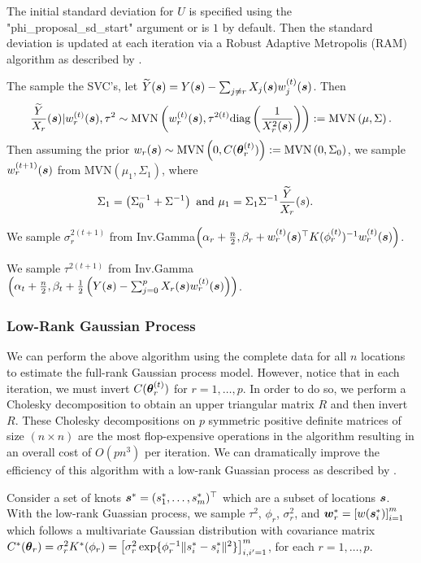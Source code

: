 The initial standard deviation for $U$ is specified using the "phi\_proposal\_sd\_start" argument or is $1$ by default. Then the standard deviation is updated at each iteration via a Robust Adaptive Metropolis (RAM) algorithm as described by \cite{vihola}.

The sample the SVC's, let $\widetilde{Y}(\boldsymbol{s}) = Y(\boldsymbol{s}) - \sum_{j\neq r} X_j(\boldsymbol{s})w_j^{(t)}(\boldsymbol{s})$. Then
\begin{align*}
    \frac{\widetilde{Y}}{X_r}(\boldsymbol{s}) | w_r^{(t)}(\boldsymbol{s}), \tau^2 \sim \text{MVN} \left(w_r^{(t)}(\boldsymbol{s}), \tau^{2(t)} \text{diag}\left( \frac{1}{X_r^2(\boldsymbol{s})} \right)\right) := \text{MVN} \left(\mu, \Sigma\right).
\end{align*}
Then assuming the prior $w_r(\boldsymbol{s}) \sim \text{MVN}\left(0, C(\boldsymbol{\theta}_r^{(t)})\right) := \text{MVN}\left(0, \Sigma_0\right)$, we sample $w_r^{(t+1)}(\boldsymbol{s})$ from MVN$(\mu_1, \Sigma_1)$, where
\begin{align*}
    \Sigma_1 &= \left(\Sigma_0^{-1} + \Sigma^{-1}\right) \text{ and }
    \mu_1 = \Sigma_1 \Sigma^{-1} \frac{\widetilde{Y}}{X_r}(s).
\end{align*}

We sample $\sigma_r^{2(t+1)}$ from Inv.Gamma$\left(\alpha_r + \frac{n}{2}, \beta_r + w_r^{(t)}(\boldsymbol{s})^{\top} K(\phi_r^{(t)})^{-1} w_r^{(t)}(\boldsymbol{s})\right)$.

We sample $\tau^{2(t+1)}$ from Inv.Gamma$\left(\alpha_t + \frac{n}{2}, \beta_t + \frac{1}{2} \left(Y(\boldsymbol{s}) - \sum_{j=0}^p X_r(\boldsymbol{s})w_r^{(t)}(\boldsymbol{s}) \right)\right)$.

\subsubsection{Low-Rank Gaussian Process}
\label{sec:low_rank}

We can perform the above algorithm using the complete data for all $n$ locations to estimate the full-rank Gaussian process model. However, notice that in each iteration, we must invert $C(\boldsymbol{\theta}_r^{(t)})$ for $r = 1, \dots, p$. In order to do so, we perform a Cholesky decomposition to obtain an upper triangular matrix $R$ and then invert $R$. These Cholesky decompositions on $p$ symmetric positive definite matrices of size $(n \times n)$ are the most flop-expensive operations in the algorithm resulting in an overall cost of $O(pn^3)$ per iteration. We can dramatically improve the efficiency of this algorithm with a low-rank Guassian process as described by \cite{banerjee}.

Consider a set of knots $\boldsymbol{s}^* = (s_1^*, \dots, s_m^*)^\top$ which are a subset of locations $\boldsymbol{s}$. With the low-rank Guassian process, we sample $\tau^2$, $\phi_r$, $\sigma_r^2$, and $\boldsymbol{w}_r^* = \left[w(\boldsymbol{s}_i^*)\right]_{i=1}^m$ which follows a multivariate Gaussian distribution with covariance matrix $C^*(\boldsymbol{\theta}_r) = \sigma_r^2 K^*(\phi_r) = \left[ \sigma_r^2 \exp\{ \phi_r^{-1} \| s_{i}^* - s_{i}^* \|^2 \} \right]_{i, i' = 1}^m$, for each $r = 1, \dots, p$.

